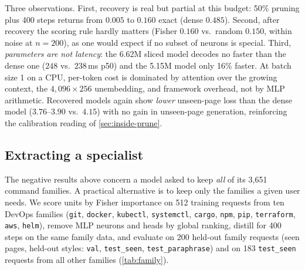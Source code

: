 Three observations. First, recovery is real but partial at this budget: 50\%
pruning plus 400 steps returns from $0.005$ to $0.160$ exact (dense
$0.485$). Second, after recovery the scoring rule hardly matters (Fisher
$0.160$ vs.\ random $0.150$, within noise at $n{=}200$), as one would expect if
no subset of neurons is special. Third, \emph{parameters are not latency}:
the 6.62M sliced model decodes no faster than the dense one ($248$ vs.\
$238$\,ms p50) and the 5.15M model only 16\% faster. At batch size 1 on a CPU,
per-token cost is dominated by attention over the growing context, the
$4{,}096\times256$ unembedding, and framework overhead, not by MLP
arithmetic. Recovered models again show \emph{lower} unseen-page loss than
the dense model ($3.76$--$3.90$ vs.\ $4.15$) with no gain in unseen-page
generation, reinforcing the calibration reading of \cref{sec:inside-prune}.

\subsection{Extracting a specialist}
\label{sec:inside-family}

The negative results above concern a model asked to keep \emph{all} of its
3{,}651 command families. A practical alternative is to keep only the
families a given user needs. We score units by Fisher importance on 512
training requests from ten DevOps families (\texttt{git}, \texttt{docker},
\texttt{kubectl}, \texttt{systemctl}, \texttt{cargo}, \texttt{npm},
\texttt{pip}, \texttt{terraform}, \texttt{aws}, \texttt{helm}), remove MLP
neurons and heads by global ranking, distill for 400 steps on the same family
data, and evaluate on 200 held-out family requests (seen pages, held-out
styles: \texttt{val}, \texttt{test\_seen}, \texttt{test\_paraphrase}) and on
183 \texttt{test\_seen} requests from all other families
(\cref{tab:family}).

